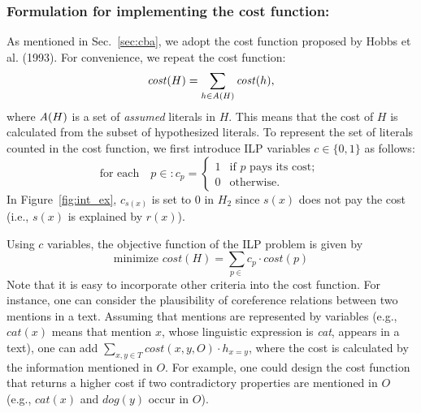\documentclass[english]{jnlp_1.4}
\def\P{}
\begin{document}
\subsubsection{Formulation for implementing the cost function: } As
mentioned in Sec.~\ref{sec:cba}, 
we adopt the cost function proposed by Hobbs et
al. (1993)\nocite{Hobbs93}. For convenience, we repeat the cost
function:
\begin{equation}
  \mathit{cost}(H) = \sum_{h \in \emph{A}(H)} \mathit{cost}(h), \label{eqn:ilpobj}
\end{equation}
where $\emph{A}(H)$ is a set of \emph{assumed} literals in $H$. This
means that the cost of $H$ is calculated from the subset of
hypothesized literals. To represent the set of literals 
counted in the cost function, we first introduce ILP variables $c \in
\{0,1\}$ as follows:
\[
\text{for each}\quad p \in \P: c_p = \begin{cases}
  1 & \text{if } p \mbox{ pays its cost; } \\
  0 & \text{otherwise.}
\end{cases}
\]
In Figure~\ref{fig:int_ex}, $c_{s(x)}$ is set to 0 in $H_2$ since
$s(x)$ does not pay the cost (i.e., $s(x)$ is explained by $r(x)$).

Using $c$ variables, the objective function of the ILP problem is
given by
\begin{equation}
  \mbox{minimize } cost(H) = \sum_{p \in \P} c_p \cdot cost(p) \label{eqn:ilp}
\end{equation}
Note that it is easy to incorporate other criteria into the cost
function. For instance, one can consider the plausibility of
coreference relations between two mentions in a text. Assuming that
mentions are represented by variables (e.g., $cat(x)$ means that
mention $x$, whose linguistic expression is \emph{cat}, appears in a
text), one can add $\sum_{x,y \in T} cost(x,y,O) \cdot h_{x=y}$, where
the cost is calculated by the information mentioned in $O$. For
example, one could design the cost function that returns a higher cost
if two contradictory properties are mentioned in $O$ (e.g., $cat(x)$ and
$dog(y)$ occur in $O$).
\end{document}
